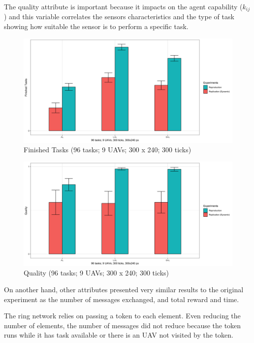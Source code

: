 The quality attribute is important because it impacts on the agent capability ($k_{ij}$) and this variable correlates the sensors characteristics and the type of task showing how suitable the sensor is to perform a specific task. 

\begin{figure}[h!]
	\begin{center}
		\includegraphics[scale=0.15]{fig/finished_orig.png}
		\caption{Finished Tasks (96 tasks; 9 UAVs; 300 x 240; 300 ticks)}
		\label{fig:fig04}
	\end{center}
\end{figure}

\begin{figure}[h!]
	\begin{center}
		\includegraphics[scale=0.15]{fig/quality_orig.png}
		\caption{Quality (96 tasks; 9 UAVs; 300 x 240; 300 ticks)}
		\label{fig:fig03}
	\end{center}
\end{figure}

On another hand, other attributes presented very similar results to the original experiment as the number of messages exchanged, and total reward and time.

The ring network relies on passing a token to each element. Even reducing the number of elements, the number of messages did not reduce because the token runs while it has task available or there is an UAV not visited by the token.

